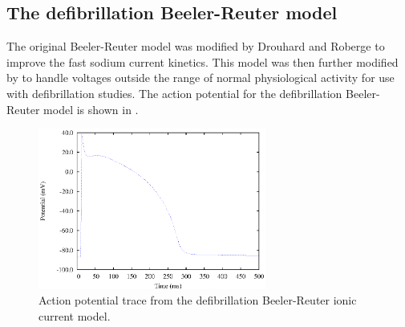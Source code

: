 \subsection{The defibrillation Beeler-Reuter model}
\label{sec:The_defibrillation_Beeler-Reuter_model}
The original Beeler-Reuter model was modified by Drouhard and Roberge
to improve the fast sodium current kinetics. This model was then further
modified by  to handle voltages outside the range of normal
physiological activity for use with defibrillation studies. The action
potential for the defibrillation Beeler-Reuter model is shown in
.
\begin{figure}[hbtp] 
  \centering
  \includegraphics[width=75mm]{cardiac_electrophysiology/epsfiles/BRDR_Vm.eps}
  \caption[Defibrillation Beeler-Reuter action potential]{Action potential
    trace from the defibrillation Beeler-Reuter ionic current model.}
  \label{fig:BRDR_ap}
\end{figure}
%
